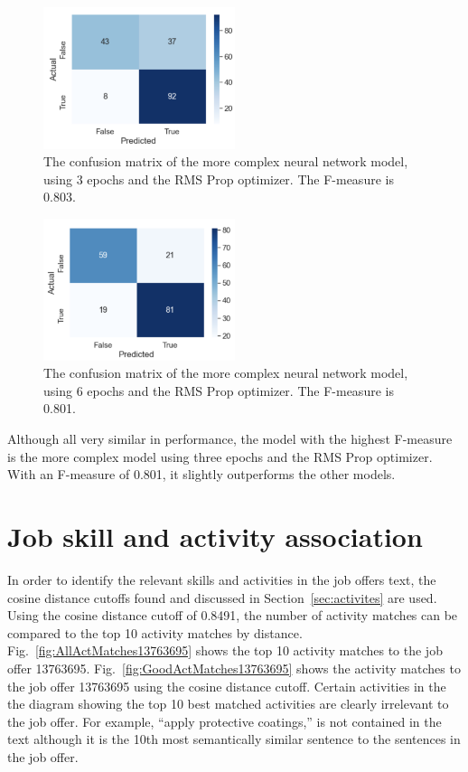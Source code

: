 \begin{figure}[htbp]
  \centering
    \includegraphics[width=0.5\textwidth]{figures/Complex3RMSProp.pdf}
    \caption{
    	The confusion matrix of the more complex neural network model, using 3 epochs and the RMS Prop optimizer. The F-measure is 0.803.
    	}
\label{fig:Complex3RMSProp}
\end{figure}

\begin{figure}[htbp]
  \centering
    \includegraphics[width=0.5\textwidth]{figures/Complex6RMSProp.pdf}
    \caption{
    	The confusion matrix of the more complex neural network model, using 6 epochs and the RMS Prop optimizer. The F-measure is 0.801.
    	}
\label{fig:Complex6RMSProp}
\end{figure}


Although all very similar in performance, the model with the highest F-measure is the more complex model using three epochs and the RMS Prop optimizer. With an F-measure of 0.801, it slightly outperforms the other models.


\section{Job skill and activity association}
\label{sec:activityresults}

In order to identify the relevant skills and activities in the job offers text, the cosine distance cutoffs found and discussed in Section~\ref{sec:activites} are used. Using the cosine distance cutoff of 0.8491, the number of activity matches can be compared to the top 10 activity matches by distance. Fig.~\ref{fig:AllActMatches13763695} shows the top 10 activity matches to the job offer 13763695. Fig.~\ref{fig:GoodActMatches13763695} shows the activity matches to the job offer 13763695 using the cosine distance cutoff. Certain activities in the the diagram showing the top 10 best matched activities are clearly irrelevant to the job offer. For example, ``apply protective coatings,'' is not contained in the text although it is the 10th most semantically similar sentence to the sentences in the job offer. 

